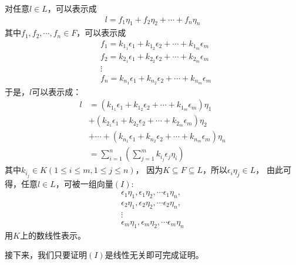 \documentclass{article}
\begin{document}
对任意$l \in L$，可以表示成
\begin{align*}
  l = f_1 \eta_1 + f_2 \eta_2 + \cdots + f_n \eta_n
\end{align*}
其中$f_1, f_2, \cdots, f_n \in F$，可以表示成
\begin{align*}
   & f_1 = k_{1_1} \epsilon_1 + k_{1_2} \epsilon_2 + \cdots + k_{1_m} \epsilon_m \\
   & f_2 = k_{2_1} \epsilon_1 + k_{2_2} \epsilon_2 + \cdots + k_{2_m} \epsilon_m \\
   & \vdots                                                                      \\
   & f_n = k_{n_1} \epsilon_1 + k_{n_2} \epsilon_2 + \cdots + k_{n_m} \epsilon_m
\end{align*}
于是，$l$可以表示成：
\begin{align*}
  l & = (k_{1_1} \epsilon_1 + k_{1_2} \epsilon_2 + \cdots + k_{1_m} \epsilon_m)\eta_1          \\
    & + (k_{2_1} \epsilon_1 + k_{2_2} \epsilon_2 + \cdots + k_{2_m} \epsilon_m)\eta_2          \\
    & + \cdots + (k_{n_1} \epsilon_1 + k_{n_2} \epsilon_2 + \cdots + k_{n_m} \epsilon_m)\eta_n \\
    & = \sum \limits_{i = 1}^n \left(\sum\limits_{j=1}^m k_{i_j} \epsilon_{j} \eta_i\right)
\end{align*}
其中$k_{i_j} \in K (1 \leq i \leq m, 1 \leq j \leq n)$，
因为$K \subseteq F \subseteq L$，所以$\epsilon_i \eta_j \in L$，
由此可得，任意$l \in L$，可被一组向量$(I)$:
\begin{align*}
  \epsilon_1 \eta_1, \epsilon_1 \eta_2, \cdots \epsilon_1 \eta_n, \\
  \epsilon_2 \eta_1, \epsilon_2 \eta_2, \cdots \epsilon_2 \eta_n, \\
  \vdots                                                          \\
  \epsilon_m \eta_1, \epsilon_m \eta_2, \cdots \epsilon_m \eta_n
\end{align*}
用$K$上的数线性表示。

接下来，我们只要证明$(I)$是线性无关即可完成证明。
\end{document}

